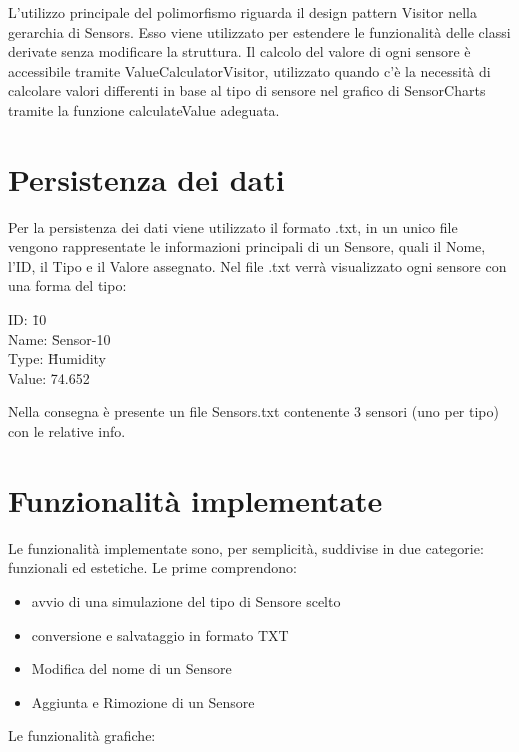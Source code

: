 \documentclass{article}
\begin{document}
L’utilizzo principale del polimorfismo riguarda il design pattern Visitor nella gerarchia di Sensors. Esso viene utilizzato per estendere le funzionalità delle classi derivate senza modificare la struttura. Il calcolo del valore di ogni sensore è accessibile tramite ValueCalculatorVisitor, utilizzato quando c’è la necessità di calcolare valori differenti in base al tipo di sensore nel grafico di SensorCharts tramite la funzione calculateValue adeguata.

\section{Persistenza dei dati}
\begin{minipage}{\textwidth}
Per la persistenza dei dati viene utilizzato il formato .txt, in un unico file vengono rappresentate le informazioni principali di un Sensore, quali il Nome, l’ID, il Tipo e il Valore assegnato. Nel file .txt verrà visualizzato ogni sensore con una forma del tipo:

\begin{tabbing}
    ID: \= 10 \\
    Name: \= Sensor-10 \\
    Type: \= Humidity \\
    Value: \= 74.652 
\end{tabbing}
 Nella consegna è presente un file Sensors.txt contenente 3 sensori (uno per tipo) con le relative info.
\end{minipage}
 \section{Funzionalità implementate}

 Le funzionalità implementate sono, per semplicità, suddivise in due categorie: funzionali ed estetiche. Le prime comprendono:
 
 \begin{itemize}
    \item avvio di una simulazione del tipo di Sensore scelto
    \item conversione e salvataggio in formato TXT
    \item Modifica del nome di un Sensore
    \item Aggiunta e Rimozione di un Sensore
\end{itemize}

\noindent
Le funzionalità grafiche:
\end{document}
